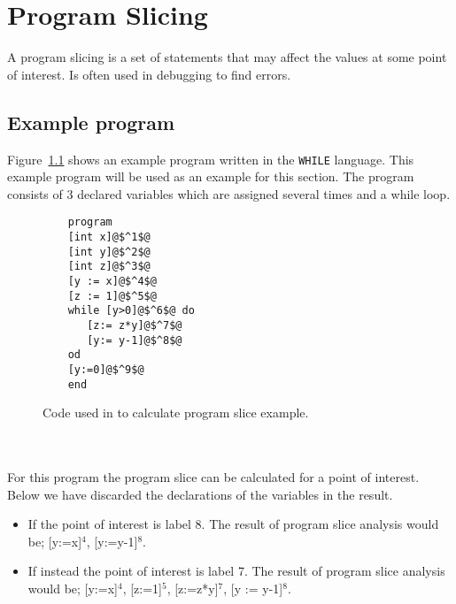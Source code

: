 \chapter{Program Slicing}
A program slicing is a set of statements that may affect the values at some point of interest. Is often used in debugging to find errors.

\section{Example program}\label{sec:exampleprogram}
Figure~\ref{fig:codeexample} shows an example program written in the \texttt{WHILE} language. This example program will be used as an example for this section. The program consists of 3 declared variables which are assigned several times and a while loop.
\begin{figure}
	\begin{lstlisting}
	program
	[int x]@$^1$@
	[int y]@$^2$@
	[int z]@$^3$@
	[y := x]@$^4$@
	[z := 1]@$^5$@
	while [y>0]@$^6$@ do
	   [z:= z*y]@$^7$@
	   [y:= y-1]@$^8$@
	od
	[y:=0]@$^9$@
	end
	\end{lstlisting}
	\caption{Code used in to calculate program slice example.}
	\label{fig:codeexample}
\end{figure}
\\\\
For this program the program slice can be calculated for a point of interest. Below we have discarded the declarations of the variables in the result.
\begin{itemize}
	\item If the point of interest is label 8. The result of program slice analysis would be; [y:=x]$^4$, [y:=y-1]$^8$.
	\item If instead the point of interest is label 7.  The result of program slice analysis would be; [y:=x]$^4$, [z:=1]$^5$, [z:=z*y]$^7$, [y := y-1]$^8$.
\end{itemize}

